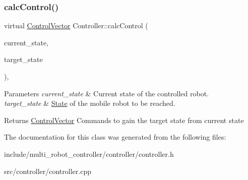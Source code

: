 \subsubsection{\texorpdfstring{calc\+Control()}{calcControl()}}
{\footnotesize\ttfamily virtual \hyperlink{structController_1_1ControlVector}{Control\+Vector} Controller\+::calc\+Control (\begin{DoxyParamCaption}\item[{\hyperlink{structController_1_1State}{State}}]{current\+\_\+state,  }\item[{\hyperlink{structController_1_1State}{State}}]{target\+\_\+state }\end{DoxyParamCaption})\hspace{0.3cm}{\ttfamily [protected]}, {}}


\begin{DoxyParams}{Parameters}
{\em current\+\_\+state} & Current state of the controlled robot. \\
\hline
{\em target\+\_\+state} & \hyperlink{structController_1_1State}{State} of the mobile robot to be reached. \\
\hline
\end{DoxyParams}
\begin{DoxyReturn}{Returns}
\hyperlink{structController_1_1ControlVector}{Control\+Vector} Commands to gain the target state from current state 
\end{DoxyReturn}


The documentation for this class was generated from the following files\+:\begin{DoxyCompactItemize}
\item 
include/multi\+\_\+robot\+\_\+controller/controller/controller.\+h\item 
src/controller/controller.\+cpp\end{DoxyCompactItemize}
